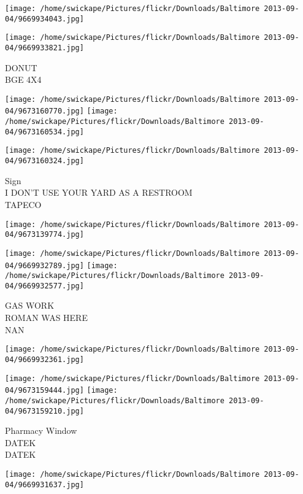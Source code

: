 \documentclass[10pt,letterpaper]{article}
\begin{document}
\texttt{[image: /home/swickape/Pictures/flickr/Downloads/Baltimore 2013-09-04/9669934043.jpg]}

\vspace{0.25in}
\texttt{[image: /home/swickape/Pictures/flickr/Downloads/Baltimore 2013-09-04/9669933821.jpg]}

DONUT\\
BGE 4X4\\
\pagebreak

\texttt{[image: /home/swickape/Pictures/flickr/Downloads/Baltimore 2013-09-04/9673160770.jpg]}
\texttt{[image: /home/swickape/Pictures/flickr/Downloads/Baltimore 2013-09-04/9673160534.jpg]}

\vspace{0.25in}
\texttt{[image: /home/swickape/Pictures/flickr/Downloads/Baltimore 2013-09-04/9673160324.jpg]}

Sign\\
I DON'T USE YOUR YARD AS A RESTROOM\\
TAPECO\\
\pagebreak

\texttt{[image: /home/swickape/Pictures/flickr/Downloads/Baltimore 2013-09-04/9673139774.jpg]}

\vspace{0.25in}
\texttt{[image: /home/swickape/Pictures/flickr/Downloads/Baltimore 2013-09-04/9669932789.jpg]}
\texttt{[image: /home/swickape/Pictures/flickr/Downloads/Baltimore 2013-09-04/9669932577.jpg]}

GAS WORK\\
ROMAN WAS HERE\\
NAN\\
\pagebreak

\texttt{[image: /home/swickape/Pictures/flickr/Downloads/Baltimore 2013-09-04/9669932361.jpg]}

\vspace{0.25in}
\texttt{[image: /home/swickape/Pictures/flickr/Downloads/Baltimore 2013-09-04/9673159444.jpg]}
\texttt{[image: /home/swickape/Pictures/flickr/Downloads/Baltimore 2013-09-04/9673159210.jpg]}

Pharmacy Window\\
DATEK\\
DATEK\\
\pagebreak

\texttt{[image: /home/swickape/Pictures/flickr/Downloads/Baltimore 2013-09-04/9669931637.jpg]}
\end{document}
